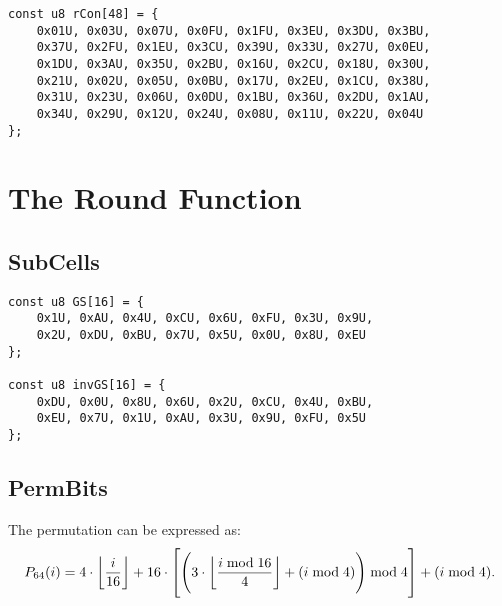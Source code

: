\begin{lstlisting}[style=C]
const u8 rCon[48] = {
	0x01U, 0x03U, 0x07U, 0x0FU, 0x1FU, 0x3EU, 0x3DU, 0x3BU,
	0x37U, 0x2FU, 0x1EU, 0x3CU, 0x39U, 0x33U, 0x27U, 0x0EU, 
	0x1DU, 0x3AU, 0x35U, 0x2BU, 0x16U, 0x2CU, 0x18U, 0x30U,
	0x21U, 0x02U, 0x05U, 0x0BU, 0x17U, 0x2EU, 0x1CU, 0x38U, 
	0x31U, 0x23U, 0x06U, 0x0DU, 0x1BU, 0x36U, 0x2DU, 0x1AU,
	0x34U, 0x29U, 0x12U, 0x24U, 0x08U, 0x11U, 0x22U, 0x04U
};
\end{lstlisting}

\newpage
\section{The Round Function}

\subsection{SubCells}

\begin{table}[h]
	\caption{Specifications of $\gift$ Sbox $GS$}
	\label{table:gift-sbox}
\end{table}
\begin{lstlisting}[style=C]
const u8 GS[16] = {
	0x1U, 0xAU, 0x4U, 0xCU, 0x6U, 0xFU, 0x3U, 0x9U,
	0x2U, 0xDU, 0xBU, 0x7U, 0x5U, 0x0U, 0x8U, 0xEU
};

const u8 invGS[16] = {
	0xDU, 0x0U, 0x8U, 0x6U, 0x2U, 0xCU, 0x4U, 0xBU,
	0xEU, 0x7U, 0x1U, 0xAU, 0x3U, 0x9U, 0xFU, 0x5U
};
\end{lstlisting}


\subsection{PermBits}
The permutation can be expressed as: \[
P_{64}(i)=4\cdot\floor*{\frac{i}{16}}+16\cdot\left[\left(3\cdot\floor*{\frac{i\bmod 16}{4}}+(i\bmod 4)\right)\bmod 4\right] + (i\bmod 4).
\]


